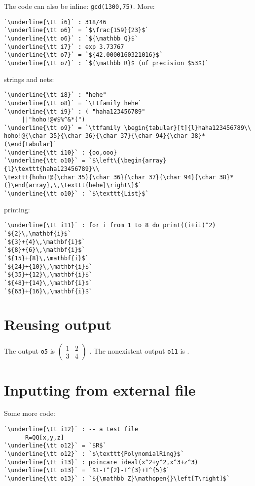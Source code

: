 \documentclass[12pt,a4paper]{amsart}
\begin{document}
The code can also be inline: \lstinline[language=Macaulay2]!gcd(1300,75)!.
More:
\begin{lstlisting}[language=Macaulay2output]
`\underline{\tt i6}` : 318/46
`\underline{\tt o6}` = `$\frac{159}{23}$`
`\underline{\tt o6}` : `${\mathbb Q}$`
`\underline{\tt i7}` : exp 3.73767
`\underline{\tt o7}` = `${42.0000160321016}$`
`\underline{\tt o7}` : `${\mathbb R}$ (of precision $53$)`
\end{lstlisting}
strings and nets:
\begin{lstlisting}[language=Macaulay2output]
`\underline{\tt i8}` : "hehe"
`\underline{\tt o8}` = `\ttfamily hehe`
`\underline{\tt i9}` : ( "haha123456789"
     ||"hoho!@#$%^&*(")
`\underline{\tt o9}` = `\ttfamily \begin{tabular}[t]{l}haha123456789\\
hoho!@{\char 35}{\char 36}{\char 37}{\char 94}{\char 38}*(\end{tabular}`
`\underline{\tt i10}` : {oo,ooo}
`\underline{\tt o10}` = `$\left\{\begin{array}{l}\texttt{haha123456789}\\
\texttt{hoho!@{\char 35}{\char 36}{\char 37}{\char 94}{\char 38}*(}\end{array},\,\texttt{hehe}\right\}$`
`\underline{\tt o10}` : `$\texttt{List}$`
\end{lstlisting}
printing:
\begin{lstlisting}[language=Macaulay2output]
`\underline{\tt i11}` : for i from 1 to 8 do print((i+ii)^2)
`${2}\,\mathbf{i}$`
`${3}+{4}\,\mathbf{i}$`
`${8}+{6}\,\mathbf{i}$`
`${15}+{8}\,\mathbf{i}$`
`${24}+{10}\,\mathbf{i}$`
`${35}+{12}\,\mathbf{i}$`
`${48}+{14}\,\mathbf{i}$`
`${63}+{16}\,\mathbf{i}$`
\end{lstlisting}

\section{Reusing output}
The output {\tt o5} is $\left(\!\begin{array}{cc}
1&2\\
3&4
\end{array}\!\right)$%
.
The nonexistent output {\tt o11} is %
.

\section{Inputting from external file}
Some more code:
\begin{lstlisting}[language=Macaulay2output]
`\underline{\tt i12}` : -- a test file
      R=QQ[x,y,z]
`\underline{\tt o12}` = `$R$`
`\underline{\tt o12}` : `$\texttt{PolynomialRing}$`
`\underline{\tt i13}` : poincare ideal(x^2+y^2,x^3+z^3)
`\underline{\tt o13}` = `$1-T^{2}-T^{3}+T^{5}$`
`\underline{\tt o13}` : `${\mathbb Z}\mathopen{}\left[T\right]$`
\end{lstlisting}
\end{document}
